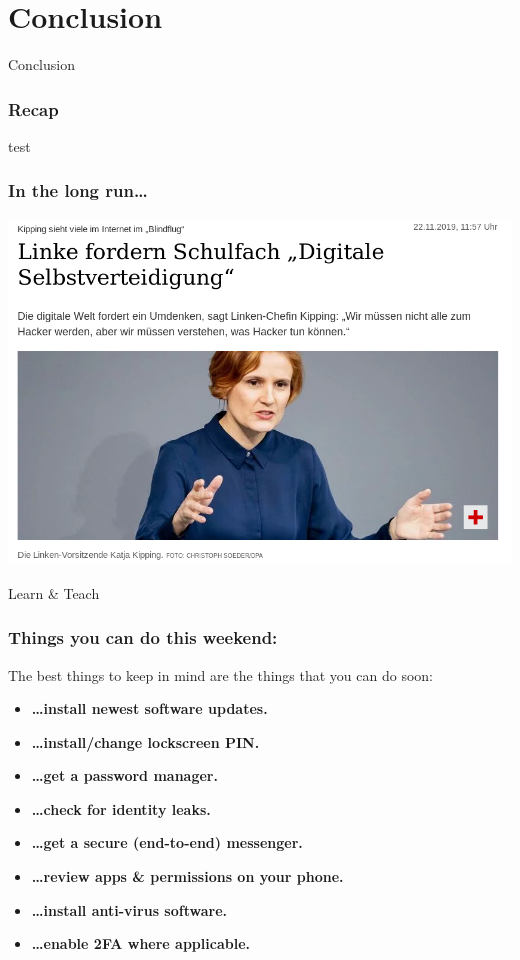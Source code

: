 \documentclass[aspectratio=169,dvipsnames]{beamer}
\begin{document}


\section{Conclusion}
\begin{frame}
\begin{center}
\huge Conclusion
\end{center}
\end{frame}

\begin{frame}
\frametitle{Recap}
test
\end{frame}

\begin{frame}
\frametitle{In the long run\dots}
\begin{center}
\includegraphics[scale=0.25]{images/kipping.png}
\bigskip

\Large
Learn \& Teach
\end{center}
\end{frame}

\begin{frame}
\frametitle{Things you can do this weekend:}

The best things to keep in mind are the things that you can do soon:
\bigskip

\begin{itemize}
\pause\item\textbf{\dots install newest software updates.}
\pause\item\textbf{\dots install/change lockscreen PIN.}
\pause\item\textbf{\dots get a password manager.}
\pause\item\textbf{\dots check for identity leaks.}
\pause\item\textbf{\dots get a secure (end-to-end) messenger.}
\pause\item\textbf{\dots review apps \& permissions on your phone.}
\pause\item\textbf{\dots install anti-virus software.}\\
\pause\item\textbf{\dots enable 2FA where applicable.}
\end{itemize}
\end{frame}
\end{document}

